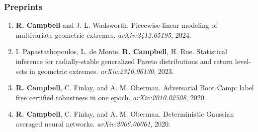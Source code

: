 \documentclass[11pt,]{scrartcl}
\begin{document}
\subsubsection{Preprints}\label{preprints}
\begin{enumerate}
  \leftskip-0.13in %
  \item \textbf{R. Campbell} and J. L. Wadsworth. Piecewise-linear modeling of multivariate geometric extremes. \emph{arXiv:2412.05195}, 2024.
  \item I. Papastathopoulos, L. de Monte, \textbf{R. Campbell}, H. Rue. Statistical inference for radially-stable generalized Pareto distributions and return level-sets in geometric extremes. \emph{arXiv:2310.06130}, 2023.
  \item \textbf{R. Campbell}, C. Finlay, and A. M. Oberman. Adversarial Boot Camp: label free certified robustness in one epoch. \emph{arXiv:2010.02508}, 2020.
  \item \textbf{R. Campbell}, C. Finlay, and A. M. Oberman. Deterministic Gaussian
averaged neural networks. \emph{arXiv:2006.06061}, 2020.
\end{enumerate}
\end{document}
